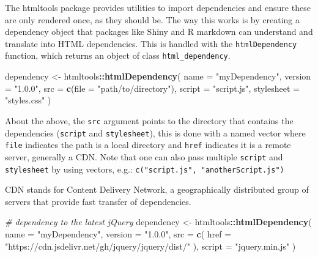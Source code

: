 \documentclass[
  10pt,
]{krantz}
\makeatletter
\newenvironment{Shaded}{\begin{snugshade}}{\end{snugshade}}
\newcommand{\CommentTok}[1]{\textcolor[rgb]{0.37,0.37,0.37}{\textit{#1}}}
\newcommand{\DataTypeTok}[1]{\textcolor[rgb]{0.27,0.27,0.27}{#1}}
\newcommand{\KeywordTok}[1]{\textcolor[rgb]{0.27,0.27,0.27}{\textbf{#1}}}
\newcommand{\NormalTok}[1]{#1}
\newcommand{\OperatorTok}[1]{\textcolor[rgb]{0.43,0.43,0.43}{\textbf{#1}}}
\newcommand{\StringTok}[1]{\textcolor[rgb]{0.5,0.5,0.5}{#1}}
\newenvironment{kframe}{%
\medskip{}
\setlength{\fboxsep}{.8em}
 \def\at@end@of@kframe{}%
 \ifinner\ifhmode%
  \def\at@end@of@kframe{\end{minipage}}%
  \begin{minipage}{\columnwidth}%
 \fi\fi%
 \def\FrameCommand##1{\hskip\@totalleftmargin \hskip-\fboxsep
 \colorbox{shadecolor}{##1}\hskip-\fboxsep
     \hskip-\linewidth \hskip-\@totalleftmargin \hskip\columnwidth}%
 \MakeFramed {\advance\hsize-\width
   \@totalleftmargin\z@ \linewidth\hsize
   \@setminipage}}%
 {\par\unskip\endMakeFramed%
 \at@end@of@kframe}
\renewenvironment{Shaded}{\begin{kframe}}{\end{kframe}}
\newenvironment{rmdblock}[1]
  {
  \begin{itemize}
  \renewcommand{\labelitemi}{
    \raisebox{-.7\height}[0pt][0pt]{
      {\setkeys{Gin}{width=3em,keepaspectratio}\texttt{[image: images/\#1]}}
    }
  }
  \setlength{\fboxsep}{1em}
  \begin{kframe}
  \item
  }
  {
  \end{kframe}
  \end{itemize}
  }
\newenvironment{rmdnote}
  {\begin{rmdblock}{note}}
  {\end{rmdblock}}
\makeatother
\begin{document}
The htmltools package provides utilities to import dependencies and ensure these are only rendered once, as they should be. The way this works is by creating a dependency object that packages like Shiny and R markdown can understand and translate into HTML dependencies. This is handled with the \texttt{htmlDependency} function, which returns an object of class \texttt{html\_dependency}.

\begin{Shaded}
\begin{Highlighting}[]
\NormalTok{dependency <{-}}\StringTok{ }\NormalTok{htmltools}\OperatorTok{::}\KeywordTok{htmlDependency}\NormalTok{(}
  \DataTypeTok{name =} \StringTok{"myDependency"}\NormalTok{,}
  \DataTypeTok{version =} \StringTok{"1.0.0"}\NormalTok{,}
  \DataTypeTok{src =} \KeywordTok{c}\NormalTok{(}\DataTypeTok{file =} \StringTok{"path/to/directory"}\NormalTok{),}
  \DataTypeTok{script =} \StringTok{"script.js"}\NormalTok{,}
  \DataTypeTok{stylesheet =} \StringTok{"styles.css"}
\NormalTok{)}
\end{Highlighting}
\end{Shaded}

About the above, the \texttt{src} argument points to the directory that contains the dependencies (\texttt{script} and \texttt{stylesheet}), this is done with a named vector where \texttt{file} indicates the path is a local directory and \texttt{href} indicates it is a remote server, generally a CDN. Note that one can also pass multiple \texttt{script} and \texttt{stylesheet} by using vectors, e.g.: \texttt{c("script.js",\ "anotherScript.js")}

\begin{rmdnote}
CDN stands for Content Delivery Network, a geographically distributed
group of servers that provide fast transfer of dependencies.
\end{rmdnote}

\begin{Shaded}
\begin{Highlighting}[]
\CommentTok{\# dependency to the latest jQuery}
\NormalTok{dependency <{-}}\StringTok{ }\NormalTok{htmltools}\OperatorTok{::}\KeywordTok{htmlDependency}\NormalTok{(}
  \DataTypeTok{name =} \StringTok{"myDependency"}\NormalTok{,}
  \DataTypeTok{version =} \StringTok{"1.0.0"}\NormalTok{,}
  \DataTypeTok{src =} \KeywordTok{c}\NormalTok{(}
    \DataTypeTok{href =} \StringTok{"https://cdn.jsdelivr.net/gh/jquery/jquery/dist/"}
\NormalTok{  ),}
  \DataTypeTok{script =} \StringTok{"jquery.min.js"}
\NormalTok{)}
\end{Highlighting}
\end{Shaded}
\end{document}
